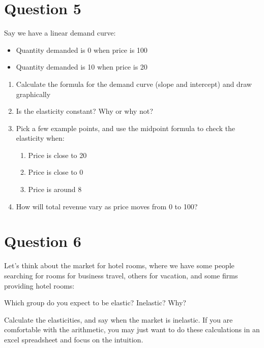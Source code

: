 \documentclass[12pt]{article}
\begin{document}
\section*{Question 5}
Say we have a linear demand curve:
\begin{itemize}
    \item Quantity demanded is 0 when price is 100
    \item Quantity demanded is 10 when price is 20
\end{itemize}

\medskip

\begin{enumerate}
    \item Calculate the formula for the demand curve (slope and intercept) and draw graphically
    \item Is the elasticity constant? Why or why not?
    \item Pick a few example points, and use the midpoint formula to check the elasticity when:
        \begin{enumerate}
            \item Price is close to 20
            \item Price is close to 0
            \item Price is around 8
        \end{enumerate}
    \item How will total revenue vary as price moves from 0 to 100?
\end{enumerate}

\section*{Question 6}
Let's think about the market for hotel rooms, where we have some people searching for rooms for business travel, others for vacation, and some firms providing hotel rooms:

\begin{center}
    
\end{center}

Which group do you expect to be elastic? Inelastic? Why?

\vspace{2mm}

Calculate the elasticities, and say when the market is inelastic. If you are comfortable with the arithmetic, you may just want to do these calculations in an excel spreadsheet and focus on the intuition.
\end{document}
